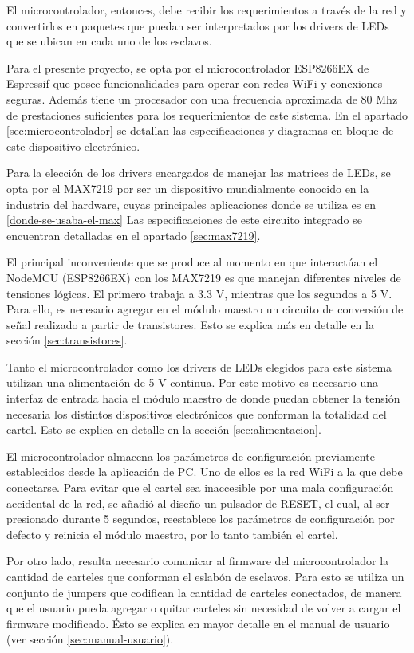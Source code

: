 El microcontrolador, entonces, debe recibir los requerimientos a través de la red y convertirlos en paquetes que puedan ser interpretados por los drivers de LEDs que se ubican en cada uno de los esclavos.

Para el presente proyecto, se opta por el microcontrolador ESP8266EX de Espressif que posee funcionalidades para operar con redes WiFi y conexiones seguras. Además tiene un procesador con una frecuencia aproximada de 80 Mhz de prestaciones suficientes para los requerimientos de este sistema. En el apartado \ref{sec:microcontrolador} se detallan las especificaciones y diagramas en bloque de este dispositivo electrónico.

Para la elección de los drivers encargados de manejar las matrices de LEDs, se opta por el MAX7219 por ser un dispositivo mundialmente conocido en la industria del hardware, cuyas principales aplicaciones donde se utiliza es en 
\ref{donde-se-usaba-el-max}
Las especificaciones de este circuito integrado se encuentran detalladas en el apartado \ref{sec:max7219}.

El principal inconveniente que se produce al momento en que interactúan el NodeMCU (ESP8266EX) con los MAX7219 es que manejan diferentes niveles de tensiones lógicas. El primero trabaja a 3.3 V, mientras que los segundos a 5 V. Para ello, es necesario agregar en el módulo maestro un circuito de conversión de señal realizado a partir de transistores. Esto se explica más en detalle en la sección \ref{sec:transistores}.

Tanto el microcontrolador como los drivers de LEDs elegidos para este sistema utilizan una alimentación de 5 V continua. Por este motivo es necesario una interfaz de entrada hacia el módulo maestro de donde puedan obtener la tensión necesaria los distintos dispositivos electrónicos que conforman la totalidad del cartel. Esto se explica en detalle en la sección \ref{sec:alimentacion}.

El microcontrolador almacena los parámetros de configuración previamente establecidos desde la aplicación de PC. Uno de ellos es la red WiFi a la que debe conectarse. Para evitar que el cartel sea inaccesible por una mala configuración accidental de la red, se añadió al diseño un pulsador de RESET, el cual, al ser presionado durante 5 segundos, reestablece los parámetros de configuración por defecto y reinicia el módulo maestro, por lo tanto también el cartel.

Por otro lado, resulta necesario comunicar al firmware del microcontrolador la cantidad de carteles que conforman el eslabón de esclavos. Para esto se utiliza un conjunto de jumpers que codifican la cantidad de carteles conectados, de manera que el usuario pueda agregar o quitar carteles sin necesidad de volver a cargar el firmware modificado. Ésto se explica en mayor detalle en el manual de usuario (ver sección \ref{sec:manual-usuario}).

